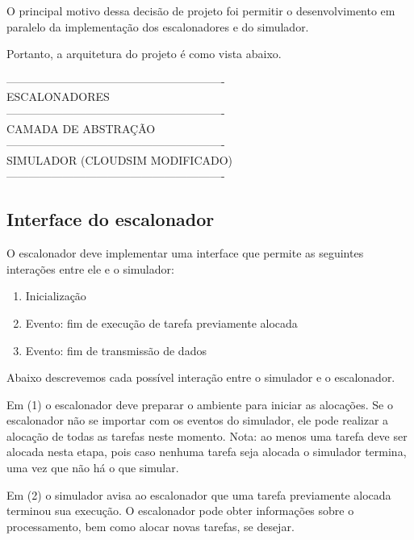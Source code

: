 \documentclass[a4paper,10pt]{article}
\begin{document}
O principal motivo dessa decisão de projeto foi permitir o desenvolvimento em paralelo da implementação dos escalonadores
e do simulador.

Portanto, a arquitetura do projeto é como vista abaixo.

\begin{center}
----------------------------------------------------------\\
                ESCALONADORES                 \\
----------------------------------------------------------\\
             CAMADA DE ABSTRAÇÃO              \\
----------------------------------------------------------\\
        SIMULADOR (CLOUDSIM MODIFICADO)        \\
----------------------------------------------------------\\
\end{center}

\subsection{Interface do escalonador}

O escalonador deve implementar uma interface que permite as seguintes
interações entre ele e o simulador:

\begin{enumerate}

  \item Inicialização
  \item Evento: fim de execução de tarefa previamente alocada
  \item Evento: fim de transmissão de dados

\end{enumerate}

Abaixo descrevemos cada possível interação entre o simulador e o escalonador.

Em (1) o escalonador deve preparar o ambiente para iniciar as alocações. Se o escalonador
não se importar com os eventos do simulador, ele pode realizar a alocação de todas as tarefas
neste momento. Nota: ao menos uma tarefa deve ser alocada nesta etapa, pois caso nenhuma tarefa
seja alocada o simulador termina, uma vez que não há o que simular.

Em (2) o simulador avisa ao escalonador que uma tarefa previamente alocada terminou sua execução.
O escalonador pode obter informações sobre o processamento, bem como alocar novas tarefas, se desejar.
\end{document}
